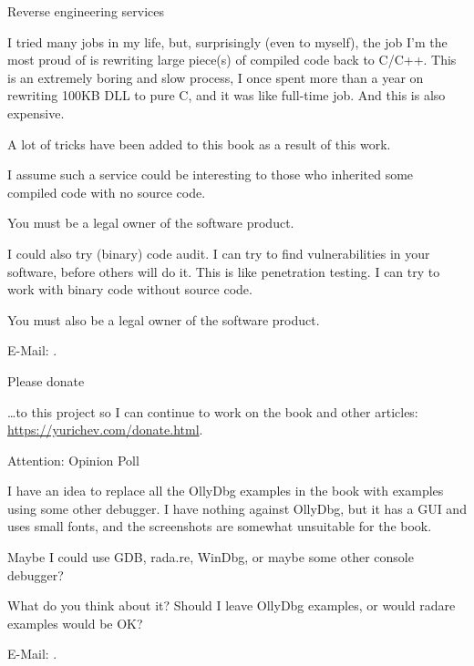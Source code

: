 \vspace*{\fill}

\huge Reverse engineering services
\normalsize

\bigskip
\bigskip
\bigskip

I tried many jobs in my life, but, surprisingly (even to myself),
the job I'm the most proud of is rewriting large piece(s) of compiled code back to C/C++.
This is an extremely boring and slow process, I once spent more than a year on rewriting 100KB DLL to pure C,
and it was like full-time job.
And this is also expensive.

A lot of tricks have been added to this book as a result of this work.

I assume such a service could be interesting to those who inherited some compiled code with no source code.

You must be a legal owner of the software product.

\bigskip

I could also try (binary) code audit.
I can try to find vulnerabilities in your software, before others will do it.
This is like penetration testing.
I can try to work with binary code without source code.

You must also be a legal owner of the software product.

E-Mail: \GTT{\EMAIL}.

\bigskip
\bigskip
\bigskip

\huge Please donate
\normalsize

\bigskip
\bigskip
\bigskip

\dots to this project so I can continue to work on the book and other articles: \\
\url{https://yurichev.com/donate.html}.

\bigskip
\bigskip
\bigskip

\huge Attention: Opinion Poll
\normalsize

\bigskip
\bigskip
\bigskip

I have an idea to replace all the OllyDbg examples in the book with examples using some other debugger.
I have nothing against OllyDbg, but it has a GUI and uses small fonts, and the screenshots are somewhat unsuitable for the book.

Maybe I could use GDB, rada.re, WinDbg, or maybe some other console debugger?

What do you think about it?
Should I leave OllyDbg examples, or would radare examples would be OK?

E-Mail: \GTT{\EMAIL}.

\vspace*{\fill}
\vfill
